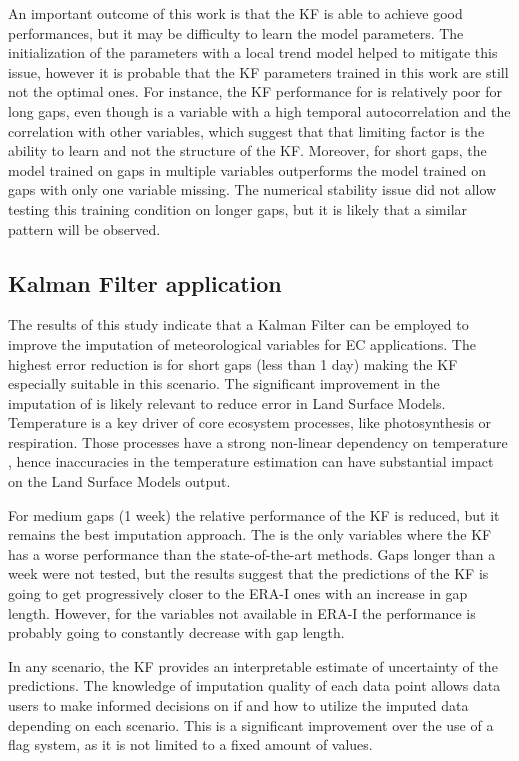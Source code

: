 \documentclass{article}
\let\Oldsubsection\subsection
\renewcommand{\subsection}{\FloatBarrier\Oldsubsection}
\begin{document}
An important outcome of this work is that the KF is able to achieve good performances, but it may be difficulty to learn the  model parameters. The initialization of the parameters with a local trend model helped to mitigate this issue, however it is probable that the KF parameters trained in this work are still not the optimal ones. For instance, the KF performance for  is relatively poor for long gaps, even though is a variable with a high temporal autocorrelation and the correlation with other variables, which suggest that that limiting factor is the ability to learn and not the structure of the KF. Moreover, for short gaps, the model trained on gaps in multiple variables outperforms the model trained on gaps with only one variable missing. The numerical stability issue did not allow testing this training condition on longer gaps, but it is likely that a similar pattern will be observed.


\subsection{Kalman Filter application}

The results of this study indicate that a Kalman Filter can be employed to improve the imputation of meteorological variables for EC applications.
The highest error reduction is for short gaps (less than 1 day) making the KF especially suitable in this scenario. The significant improvement in the imputation of  is likely relevant to reduce error in Land Surface Models. Temperature is a key driver of core ecosystem processes, like photosynthesis or respiration. Those processes have a strong non-linear dependency on temperature \cite{bonan_climate_2019-2}, hence inaccuracies in the temperature estimation can have substantial impact on the Land Surface Models output.

For medium gaps (1 week) the relative performance of the KF is reduced, but it remains the best imputation approach. The  is the only variables where the KF has a worse performance than the state-of-the-art methods.
Gaps longer than a week were not tested, but the results suggest that the predictions of the KF is going to get progressively closer to the ERA-I ones with an increase in gap length. However, for the variables not available in ERA-I the performance is probably going to constantly decrease with gap length.

In any scenario, the KF provides an interpretable estimate of uncertainty of the predictions. The knowledge of imputation quality of each data point allows data users to make informed decisions on if and how to utilize the imputed data depending on each scenario. This is a significant improvement over the use of a flag system, as it is not limited to a fixed amount of values.
\end{document}
